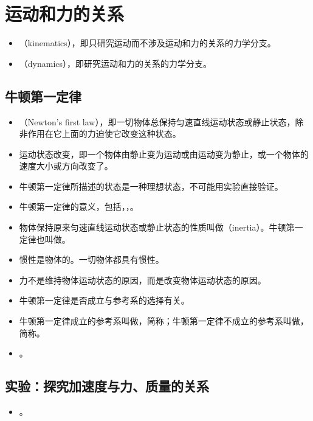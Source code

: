 \section{运动和力的关系}

\vspace{10pt}
\begin{itemize}
\item {}（kinematics），即只研究运动而不涉及运动和力的关系的力学分支。
\item {}（dynamics），即研究运动和力的关系的力学分支。
\end{itemize}

\subsection{牛顿第一定律}
\begin{itemize}
\item {}（Newton's first law），即一切物体总保持匀速直线运动状态或静止状态，除非作用在它上面的力迫使它改变这种状态。
\item 运动状态改变，即一个物体由静止变为运动或由运动变为静止，或一个物体的速度大小或方向改变了。
\item 牛顿第一定律所描述的状态是一种理想状态，不可能用实验直接验证。
\item 牛顿第一定律的意义，包括，，。
\item 物体保持原来匀速直线运动状态或静止状态的性质叫做（inertia）。牛顿第一定律也叫做。
\item 惯性是物体的。一切物体都具有惯性。
\item 力不是维持物体运动状态的原因，而是改变物体运动状态的原因。
\item 牛顿第一定律是否成立与参考系的选择有关。
\item 牛顿第一定律成立的参考系叫做，简称；牛顿第一定律不成立的参考系叫做，简称。
\item {}。
\end{itemize}

\subsection{实验：探究加速度与力、质量的关系}
\begin{itemize}
\item {}。
\end{itemize}

